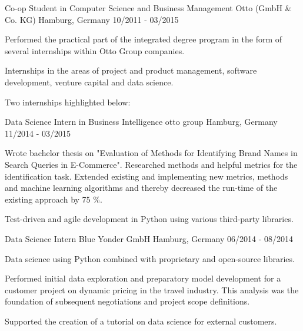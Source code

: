 \begin{cventries}
  \cventry
    {Co-op Student in Computer Science and Business Management} %
    {Otto (GmbH \& Co. KG)} %
    {Hamburg, Germany} %
    {10/2011 - 03/2015} %
    {
      \begin{cvitems} %
        \item {Performed the practical part of the integrated degree program in the form of several internships within Otto Group companies.}
        \item {Internships in the areas of project and product management, software development, venture capital and data science.}
        \item{Two internships highlighted below:}
      \end{cvitems}
    }

  \cventry
    {Data Science Intern in Business Intelligence} %
    {otto group} %
    {Hamburg, Germany} %
    {11/2014 - 03/2015} %
    {
      \begin{cvitems} %
        \item {Wrote bachelor thesis on "Evaluation of Methods for Identifying Brand Names in Search Queries in E-Commerce". Researched methods and helpful metrics for the identification task. Extended existing and implementing new metrics, methods and machine learning algorithms and thereby decreased the run-time of the existing approach by 75 \%.}
        \item {Test-driven and agile development in Python using various third-party libraries.}
      \end{cvitems}
    }

  \cventry
    {Data Science Intern} %
    {Blue Yonder GmbH} %
    {Hamburg, Germany} %
    {06/2014 - 08/2014} %
    {
      \begin{cvitems} %
        \item {Data science using Python combined with proprietary and open-source libraries.}
        \item {Performed initial data exploration and preparatory model development for a customer project on dynamic pricing in the travel industry. This analysis was the foundation of subsequent negotiations and project scope definitions.}
        \item{Supported the creation of a tutorial on data science for external customers.}
      \end{cvitems}
    }


\end{cventries}

